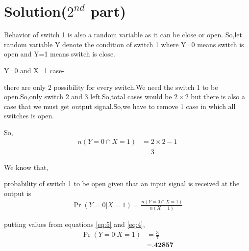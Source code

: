 \documentclass{beamer}
\providecommand{\brak}[1]{\ensuremath{\left(#1\right)}}
\begin{document}
\section{Solution($2^{nd}$ part)}
\begin{frame}
    


 Behavior of switch 1 is also a random variable as it can be close or open.
So,let random variable Y denote the condition of switch 1 where Y=0 means switch is open and Y=1 means switch is close.

Y=0 and X=1 case-

there are only 2 possibility for every switch.We need  the switch 1 to be open.So,only switch 2 and 3 left.So,total cases would be $2\times2$ but there is also a case that we must get output signal.So,we have to remove 1 case in which all switches is open.

So,
\begin{align}
\label{eq:5}
n\brak{Y = 0\cap X=1}&=2\times2-1   \nonumber\\
&=3
\end{align}
\end{frame}
\begin{frame}

We know that,

probability of switch 1 to be open given that an input signal is received at the output is
\begin{align}
\Pr\brak{Y = 0|X=1} = \frac{n\brak{Y = 0\cap X=1}}{n\brak{X=1}}          \nonumber
\end{align}


putting values from equations \eqref{eq:5} and \eqref{eq:4},
\begin{align}
\label{eq:7}
\Pr\brak{Y = 0|X=1}&=\frac{3}{7} \nonumber \\
&=\textbf{.42857}
\end{align}
\end{frame}
\end{document}
